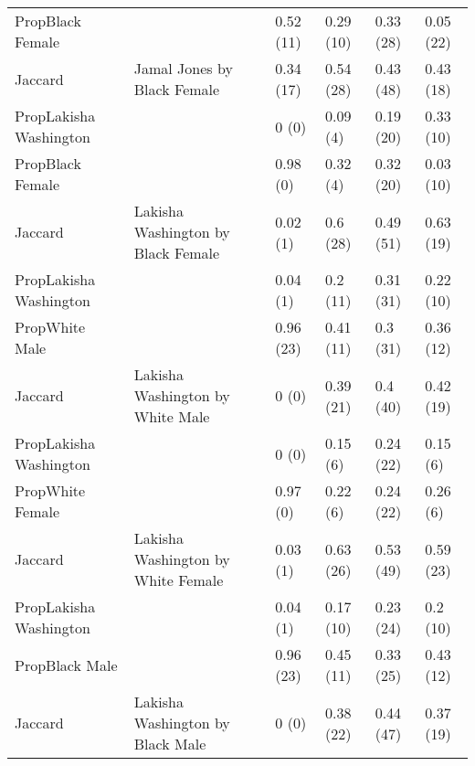 \begin{tabular}{llllll}
PropBlack Female &  & 0.52 (11) & 0.29 (10) & 0.33 (28) & 0.05 (22)\\

Jaccard & \multirow{-3}{*}{\raggedright\arraybackslash Jamal Jones by Black Female} & 0.34 (17) & 0.54 (28) & 0.43 (48) & 0.43 (18)\\
\cmidrule{1-6}
PropLakisha Washington &  & 0 (0) & 0.09 (4) & 0.19 (20) & 0.33 (10)\\

PropBlack Female &  & 0.98 (0) & 0.32 (4) & 0.32 (20) & 0.03 (10)\\

Jaccard & \multirow{-3}{*}{\raggedright\arraybackslash Lakisha Washington by Black Female} & 0.02 (1) & 0.6 (28) & 0.49 (51) & 0.63 (19)\\
\cmidrule{1-6}
PropLakisha Washington &  & 0.04 (1) & 0.2 (11) & 0.31 (31) & 0.22 (10)\\

PropWhite Male &  & 0.96 (23) & 0.41 (11) & 0.3 (31) & 0.36 (12)\\

Jaccard & \multirow{-3}{*}{\raggedright\arraybackslash Lakisha Washington by White Male} & 0 (0) & 0.39 (21) & 0.4 (40) & 0.42 (19)\\
\cmidrule{1-6}
PropLakisha Washington &  & 0 (0) & 0.15 (6) & 0.24 (22) & 0.15 (6)\\

PropWhite Female &  & 0.97 (0) & 0.22 (6) & 0.24 (22) & 0.26 (6)\\

Jaccard & \multirow{-3}{*}{\raggedright\arraybackslash Lakisha Washington by White Female} & 0.03 (1) & 0.63 (26) & 0.53 (49) & 0.59 (23)\\
\cmidrule{1-6}
PropLakisha Washington &  & 0.04 (1) & 0.17 (10) & 0.23 (24) & 0.2 (10)\\

PropBlack Male &  & 0.96 (23) & 0.45 (11) & 0.33 (25) & 0.43 (12)\\

Jaccard & \multirow{-3}{*}{\raggedright\arraybackslash Lakisha Washington by Black Male} & 0 (0) & 0.38 (22) & 0.44 (47) & 0.37 (19)\\
\bottomrule
\end{tabular}
